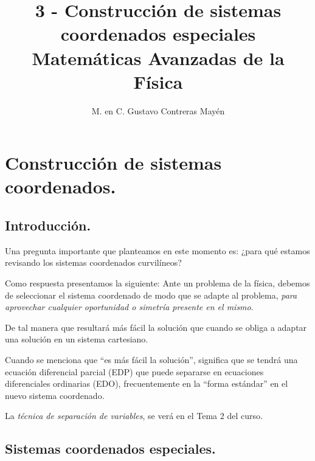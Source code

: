 
\usepackage{apacite}
\title{3 - Construcción de sistemas coordenados especiales \\[0.3em]  \large{Matemáticas Avanzadas de la Física}\vspace{-3ex}}
\author{M. en C. Gustavo Contreras Mayén}
\date{ }

\vspace{-4cm}
\maketitle
\fontsize{14}{14}\selectfont
\tableofcontents
\newpage

\section{Construcción de sistemas coordenados.}
\subsection{Introducción.}

Una pregunta importante que planteamos en este momento es: ¿para qué estamos revisando los sistemas coordenados curvilíneos?
\par
Como respuesta presentamos la siguiente: Ante un problema de la física, debemos de seleccionar el sistema coordenado de modo que se adapte al problema, \emph{para aprovechar cualquier oportunidad o simetría presente en el mismo}.
\par
De tal manera que resultará más fácil la solución que cuando se obliga a adaptar una solución en un sistema cartesiano.
\par
Cuando se menciona que \enquote{es más fácil la solución}, significa que se tendrá una ecuación diferencial parcial (EDP) que puede separarse en ecuaciones diferenciales ordinarias (EDO), frecuentemente en la \enquote{forma estándar} en el nuevo sistema coordenado.
\par
La \emph{técnica de separación de variables}, se verá en el Tema 2 del curso.

\subsection{Sistemas coordenados especiales.}

